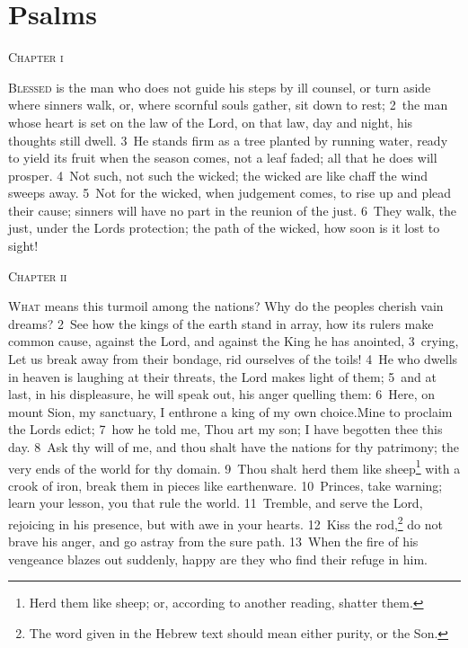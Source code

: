 \documentclass[10pt]{book} %
\begin{document}
\chapter*{Psalms}

\begin{large}\begin{center}\textsc{Chapter i}\end{center}\end{large}
\lettrine[lines=3]{B}{lessed} is the man who does not guide his steps by ill counsel, or turn aside where sinners walk, or, where scornful souls gather, sit down to rest; \textcolor{benred8}{2}~the man whose heart is set on the law of the Lord, on that law, day and night, his thoughts still dwell. \textcolor{benred8}{3}~He stands firm as a tree planted by running water, ready to yield its fruit when the season comes, not a leaf faded; all that he does will prosper. \textcolor{benred8}{4}~Not such, not such the wicked; the wicked are like chaff the wind sweeps away. \textcolor{benred8}{5}~Not for the wicked, when judgement comes, to rise up and plead their cause; sinners will have no part in the reunion of the just. \textcolor{benred8}{6}~They walk, the just, under the Lord\textquotesingle s protection; the path of the wicked, how soon is it lost to sight!
\begin{large}\begin{center}\textsc{Chapter ii}\end{center}\end{large}
\lettrine[lines=2]{W}{hat} means this turmoil among the nations? Why do the peoples cherish vain dreams? \textcolor{benred8}{2}~See how the kings of the earth stand in array, how its rulers make common cause, against the Lord, and against the King he has anointed, \textcolor{benred8}{3}~crying, Let us break away from their bondage, rid ourselves of the toils! \textcolor{benred8}{4}~He who dwells in heaven is laughing at their threats, the Lord makes light of them; \textcolor{benred8}{5}~and at last, in his displeasure, he will speak out, his anger quelling them: \textcolor{benred8}{6}~Here, on mount Sion, my sanctuary, I enthrone a king of my own choice.Mine to proclaim the Lord\textquotesingle s edict; \textcolor{benred8}{7}~how he told me, Thou art my son; I have begotten thee this day. \textcolor{benred8}{8}~Ask thy will of me, and thou shalt have the nations for thy patrimony; the very ends of the world for thy domain. \textcolor{benred8}{9}~Thou shalt herd them like sheep\footnote[1]{\textasciigrave Herd them like sheep\textquotesingle ; or, according to another reading, \textasciigrave shatter them\textquotesingle .} with a crook of iron, break them in pieces like earthenware. \textcolor{benred8}{10}~Princes, take warning; learn your lesson, you that rule the world. \textcolor{benred8}{11}~Tremble, and serve the Lord, rejoicing in his presence, but with awe in your hearts. \textcolor{benred8}{12}~Kiss the rod,\footnote[2]{The word given in the Hebrew text should mean either \textasciigrave purity\textquotesingle , or \textasciigrave the Son\textquotesingle .} do not brave his anger, and go astray from the sure path. \textcolor{benred8}{13}~When the fire of his vengeance blazes out suddenly, happy are they who find their refuge in him.
\end{document}
